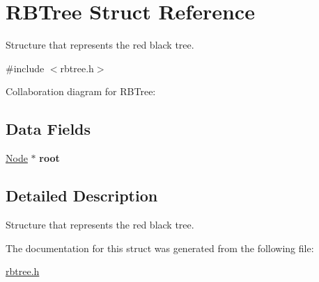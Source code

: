 \hypertarget{structRBTree}{}\section{R\+B\+Tree Struct Reference}
\label{structRBTree}


Structure that represents the red black tree.  




{\ttfamily \#include $<$rbtree.\+h$>$}



Collaboration diagram for R\+B\+Tree\+:
\subsection*{Data Fields}
\begin{DoxyCompactItemize}
\item 
\hyperlink{structNode}{Node} $\ast$ {\bfseries root}\hypertarget{structRBTree_a4f6043c7ebe229240f90c9f62ac5aff9}{}\label{structRBTree_a4f6043c7ebe229240f90c9f62ac5aff9}

\end{DoxyCompactItemize}


\subsection{Detailed Description}
Structure that represents the red black tree. 

The documentation for this struct was generated from the following file\+:\begin{DoxyCompactItemize}
\item 
\hyperlink{rbtree_8h}{rbtree.\+h}\end{DoxyCompactItemize}

